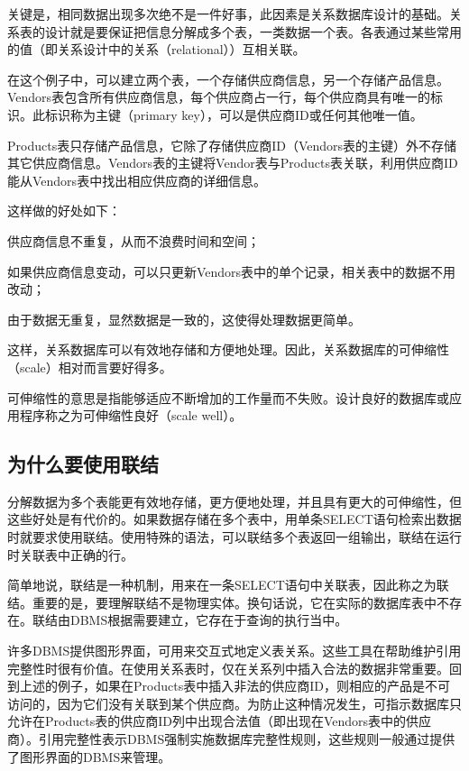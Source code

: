 关键是，相同数据出现多次绝不是一件好事，此因素是关系数据库设计的基础。关系表的设计就是要保证把信息分解成多个表，一类数据一个表。各表通过某些常用的值（即关系设计中的关系（relational））互相关联。

在这个例子中，可以建立两个表，一个存储供应商信息，另一个存储产品信息。Vendors表包含所有供应商信息，每个供应商占一行，每个供应商具有唯一的标识。此标识称为主键（primary key），可以是供应商ID或任何其他唯一值。

Products表只存储产品信息，它除了存储供应商ID（Vendors表的主键）外不存储其它供应商信息。Vendors表的主键将Vendor表与Products表关联，利用供应商ID能从Vendors表中找出相应供应商的详细信息。

这样做的好处如下：

\begin{compactitem}
\item 供应商信息不重复，从而不浪费时间和空间；
\item 如果供应商信息变动，可以只更新Vendors表中的单个记录，相关表中的数据不用改动；
\item 由于数据无重复，显然数据是一致的，这使得处理数据更简单。
\end{compactitem}



这样，关系数据库可以有效地存储和方便地处理。因此，关系数据库的可伸缩性（scale）相对而言要好得多。

可伸缩性的意思是指能够适应不断增加的工作量而不失败。设计良好的数据库或应用程序称之为可伸缩性良好（scale well）。
\subsection{为什么要使用联结}

分解数据为多个表能更有效地存储，更方便地处理，并且具有更大的可伸缩性，但这些好处是有代价的。如果数据存储在多个表中，用单条SELECT语句检索出数据时就要求使用联结。使用特殊的语法，可以联结多个表返回一组输出，联结在运行时关联表中正确的行。

简单地说，联结是一种机制，用来在一条SELECT语句中关联表，因此称之为联结。重要的是，要理解联结不是物理实体。换句话说，它在实际的数据库表中不存在。联结由DBMS根据需要建立，它存在于查询的执行当中。

许多DBMS提供图形界面，可用来交互式地定义表关系。这些工具在帮助维护引用完整性时很有价值。在使用关系表时，仅在关系列中插入合法的数据非常重要。回到上述的例子，如果在Products表中插入非法的供应商ID，则相应的产品是不可访问的，因为它们没有关联到某个供应商。为防止这种情况发生，可指示数据库只允许在Products表的供应商ID列中出现合法值（即出现在Vendors表中的供应商）。引用完整性表示DBMS强制实施数据库完整性规则，这些规则一般通过提供了图形界面的DBMS来管理。
